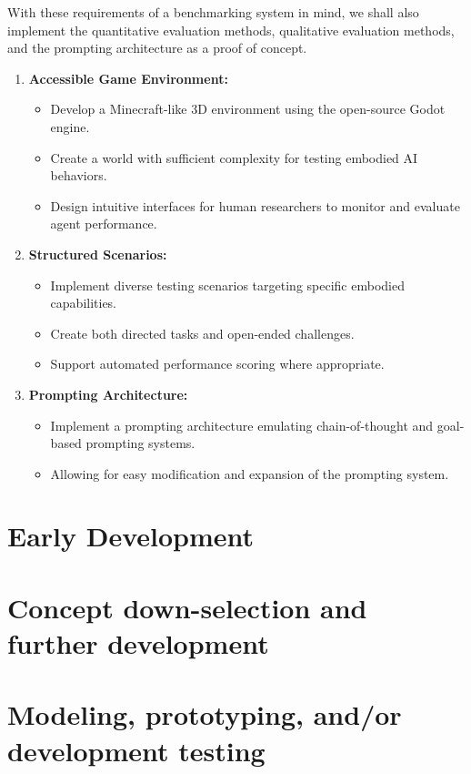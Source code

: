 \documentclass{article}
\begin{document}
With these requirements of a benchmarking system in mind, we shall also implement the quantitative evaluation methods, qualitative evaluation methods, and the prompting architecture as a proof of concept.
\begin{enumerate}
    \item \textbf{Accessible Game Environment:}
        \begin{itemize}
            \item Develop a Minecraft-like 3D environment using the open-source Godot engine.
            \item Create a world with sufficient complexity for testing embodied AI behaviors.
            \item Design intuitive interfaces for human researchers to monitor and evaluate agent performance.
        \end{itemize}
    \item \textbf{Structured Scenarios:}
        \begin{itemize}
            \item Implement diverse testing scenarios targeting specific embodied capabilities.
            \item Create both directed tasks and open-ended challenges.
            \item Support automated performance scoring where appropriate.
        \end{itemize}
    \item \textbf{Prompting Architecture:}
        \begin{itemize}
            \item Implement a prompting architecture emulating chain-of-thought and goal-based prompting systems.
            \item Allowing for easy modification and expansion of the prompting system.
        \end{itemize}
\end{enumerate}

\section{Early Development}

\section{Concept down-selection and further development}

\section{Modeling, prototyping, and/or development testing}
\end{document}
